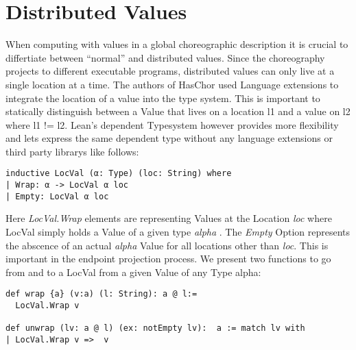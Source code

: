 \section{Distributed Values}
When computing with values in a global choreographic description it is crucial to differtiate between ``normal'' and distributed values. Since the choreography projects to different executable programs, distributed values can only live at a single location at a time. The authors of HasChor used Language extensions to integrate the location of a value into the type system. This is important to statically distinguish between a Value that lives on a location l1 and a value on l2 where l1 != l2.
Lean's dependent Typesystem however provides more flexibility and lets express the same dependent type without any language extensions or third party librarys like follows:
\begin{lstlisting}[language=lean]
inductive LocVal (α: Type) (loc: String) where
| Wrap: α -> LocVal α loc
| Empty: LocVal α loc
\end{lstlisting}
Here \emph{LocVal.Wrap} elements are representing Values at the Location \emph{loc} where LocVal simply holds a Value of a given type \emph{ alpha }.
The \emph{Empty} Option represents the abscence of an actual \emph{alpha} Value for all locations other than \emph{loc}. This is important in the endpoint projection process. We present two functions to go from and to a LocVal from a given Value of any Type alpha:

\begin{lstlisting}[language=lean]
def wrap {a} (v:a) (l: String): a @ l:=
  LocVal.Wrap v

def unwrap (lv: a @ l) (ex: notEmpty lv):  a := match lv with
| LocVal.Wrap v =>  v

\end{lstlisting}

